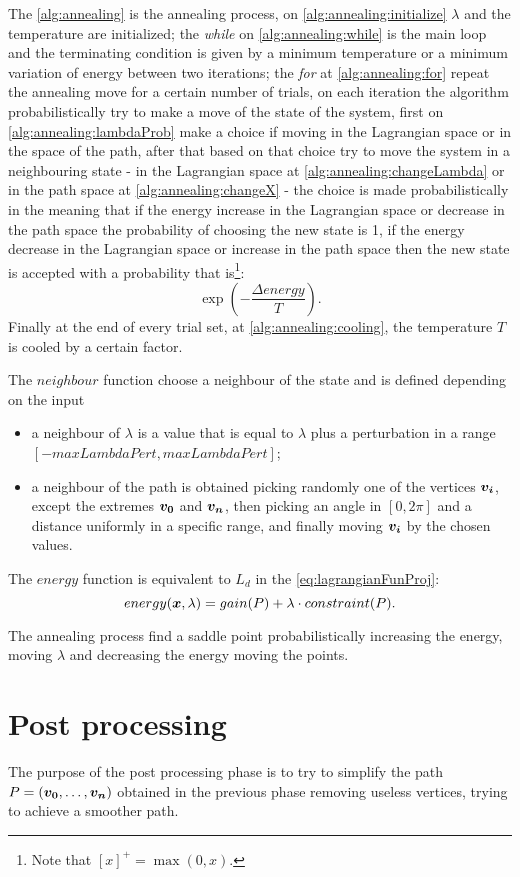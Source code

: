 \documentclass[dissertation.tex]{subfiles}
\begin{document}
The \cref{alg:annealing} is the annealing process, on
\cref{alg:annealing:initialize} $\lambda$ and the
temperature are initialized; the \emph{while} on
\cref{alg:annealing:while} is the main loop and the terminating
condition is given by a minimum temperature or a minimum variation of
energy between two iterations; the \emph{for} at
\cref{alg:annealing:for} repeat the annealing move for a certain
number of trials, on each iteration the algorithm probabilistically
try to make a move of the state of the system, first on
\cref{alg:annealing:lambdaProb} make a choice if moving in the
Lagrangian space or in the space of the path, after that based on that
choice try to move the system in a neighbouring state - in the
Lagrangian space at
\cref{alg:annealing:changeLambda} or in the path space at
\cref{alg:annealing:changeX} - the choice is made
probabilistically in the meaning that if the energy increase in the
Lagrangian space or decrease in the path space the probability of
choosing the new state is 1, if the energy decrease in the Lagrangian
space or increase in the path space then the new state is accepted
with a probability that is\footnote{Note that $[x]^+=\max(0,x)$.}:
$$\exp(-\frac{\Delta energy}{T}).$$
Finally at the end of every trial set,
at \cref{alg:annealing:cooling}, the temperature $T$ is cooled by
a certain factor.

The $neighbour$ function choose a neighbour of the state and is
defined depending on the input
\begin{itemize}
  \item a neighbour of $\lambda$ is a value that is equal to $\lambda$
    plus a perturbation in a range $[-maxLambdaPert, maxLambdaPert]$;
  \item a neighbour of the path is obtained picking randomly one of
    the vertices $\boldsymbol{v_i}$, except the extremes $\boldsymbol{v_0}$ and $\boldsymbol{v_n}$,
    then picking an angle in $[0,2\pi]$ and a distance
    uniformly in a specific range, and finally moving $\boldsymbol{v_i}$ by
    the chosen values.
\end{itemize}

The $energy$ function is equivalent to $L_d$ in the
\cref{eq:lagrangianFunProj}:
$$energy(\boldsymbol{x},\lambda)=gain(P)+\lambda\cdot constraint(P).$$

The annealing process
find a saddle point probabilistically increasing the energy, moving
$\lambda$ and 
decreasing the energy moving the points.


\section{Post processing}\label{sec:postPro}
The purpose of the post processing phase is to try to simplify the
path $P=(\boldsymbol{v_0},\dots,\boldsymbol{v_n})$ obtained in the previous phase
removing useless vertices, trying
to achieve a smoother path.
\end{document}
